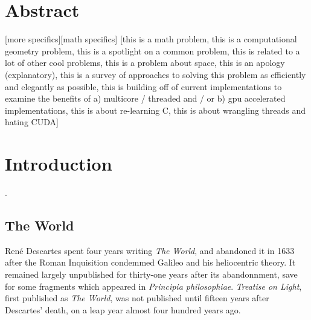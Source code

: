 \documentclass[12pt,twoside]{reedthesis}
\begin{document}
    \tableofcontents
    \listofalgorithms
    \listoffigures

    \chapter*{Abstract}
    [more specifics][math specifics]
    [this is a math problem, this is a computational geometry problem, this is a spotlight on a common problem, this is related to a lot of other cool problems, this is a problem about space, this is an apology (explanatory), this is a survey of approaches to solving this problem as efficiently and elegantly as possible, this is building off of current implementations to examine the benefits of a) multicore / threaded and / or b) gpu accelerated implementations, this is about re-learning C, this is about wrangling threads and hating CUDA]
	

  \mainmatter %
  \pagestyle{fancyplain} %


  \chapter*{Introduction}
    \setcounter{chapter}{1}
    \setcounter{section}{0}

  \citep[][p. 21]{descartes}.

  \section{The World} %
  \label{sec:the_world}
    Ren\'{e} Descartes spent four years writing \emph{The World}, and abandoned it in 1633 after the Roman Inquisition condemmed Galileo and his heliocentric theory. It remained largely unpublished for thirty-one years after its abandonnment, save for some fragments which appeared in \emph{Principia philosophiae}. \emph{Treatise on Light}, first published as \emph{The World}, was not published until fifteen years after Descartes' death, on a leap year almost four hundred years ago. \par
\end{document}
